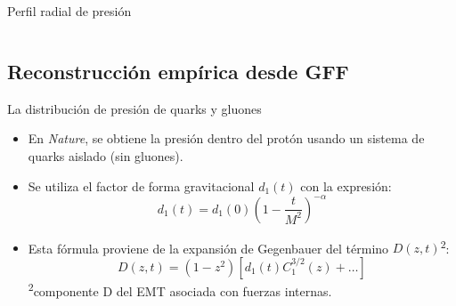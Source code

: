 \documentclass{beamer}
\begin{document}
\begin{frame}{Perfil radial de presión}
\begin{columns}
  \end{columns}
\end{frame}

\subsection{Reconstrucción empírica desde GFF}

\begin{frame}{La distribución de presión de quarks y gluones}
  \begin{itemize}
    \item En \textit{Nature}, se obtiene la presión dentro del protón usando un sistema de quarks aislado (sin gluones).
    \item Se utiliza el factor de forma gravitacional \( d_1(t) \) con la expresión:
    \[
      d_1(t) = d_1(0)\left(1 - \frac{t}{M^2}\right)^{-\alpha}
    \]
    \item Esta fórmula proviene de la expansión de Gegenbauer del término \( D(z, t) \)\textsuperscript{2}:
    \[
      D(z, t) = (1 - z^2)\left[ d_1(t) C_1^{3/2}(z) + \dots \right]
    \]
    {\tiny\textsuperscript{2}componente D del EMT asociada con fuerzas internas.}
  \end{itemize}
\end{frame}
\end{document}
